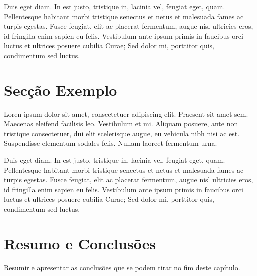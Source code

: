 Duis eget diam. In est justo, tristique in, lacinia vel, feugiat eget,
quam. Pellentesque habitant morbi tristique senectus et netus et
malesuada fames ac turpis egestas. Fusce feugiat, elit ac placerat
fermentum, augue nisl ultricies eros, id fringilla enim sapien eu
felis. Vestibulum ante ipsum primis in faucibus orci luctus et
ultrices posuere cubilia Curae; Sed dolor mi, porttitor quis,
condimentum sed luctus.

\section{Secção Exemplo}

Loren ipsum dolor sit amet, consectetuer adipiscing elit.
Praesent sit amet sem. Maecenas eleifend facilisis leo. Vestibulum et
mi. Aliquam posuere, ante non tristique consectetuer, dui elit
scelerisque augue, eu vehicula nibh nisi ac est. Suspendisse elementum
sodales felis. Nullam laoreet fermentum urna.

Duis eget diam. In est justo, tristique in, lacinia vel, feugiat eget,
quam. Pellentesque habitant morbi tristique senectus et netus et
malesuada fames ac turpis egestas. Fusce feugiat, elit ac placerat
fermentum, augue nisl ultricies eros, id fringilla enim sapien eu
felis. Vestibulum ante ipsum primis in faucibus orci luctus et
ultrices posuere cubilia Curae; Sed dolor mi, porttitor quis,
condimentum sed luctus.

\section{Resumo e Conclusões}

Resumir e apresentar as conclusões que se podem tirar no fim deste
capítulo.
